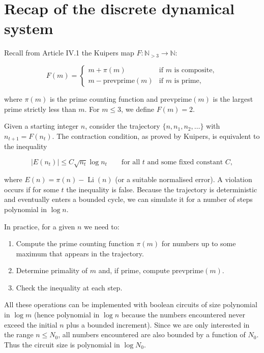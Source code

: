 \documentclass[11pt,a4paper]{article}
\begin{document}
\section{Recap of the discrete dynamical system}

Recall from Article IV.1 the Kuipers map \(F: \mathbb{N}_{>3} \to \mathbb{N}\):

\[
F(m) = \begin{cases}
m + \pi(m) & \text{if } m \text{ is composite},\\
m - \mathrm{prevprime}(m) & \text{if } m \text{ is prime},
\end{cases}
\]

where \(\pi(m)\) is the prime counting function and \(\mathrm{prevprime}(m)\) is the largest prime strictly less than \(m\). For \(m\le 3\), we define \(F(m)=2\).

Given a starting integer \(n\), consider the trajectory \(\{n, n_1, n_2, \dots\}\) with \(n_{t+1}=F(n_t)\). The contraction condition, as proved by Kuipers, is equivalent to the inequality

\[
|E(n_t)| \le C \sqrt{n_t} \log n_t \qquad \text{for all } t \text{ and some fixed constant } C,
\]

where \(E(n) = \pi(n) - \operatorname{Li}(n)\) (or a suitable normalised error). A violation occurs if for some \(t\) the inequality is false. Because the trajectory is deterministic and eventually enters a bounded cycle, we can simulate it for a number of steps polynomial in \(\log n\).

In practice, for a given \(n\) we need to:

\begin{enumerate}
\item Compute the prime counting function \(\pi(m)\) for numbers up to some maximum that appears in the trajectory.
\item Determine primality of \(m\) and, if prime, compute \(\mathrm{prevprime}(m)\).
\item Check the inequality at each step.
\end{enumerate}

All these operations can be implemented with boolean circuits of size polynomial in \(\log m\) (hence polynomial in \(\log n\) because the numbers encountered never exceed the initial \(n\) plus a bounded increment). Since we are only interested in the range \(n \le N_0\), all numbers encountered are also bounded by a function of \(N_0\). Thus the circuit size is polynomial in \(\log N_0\).
\end{document}
